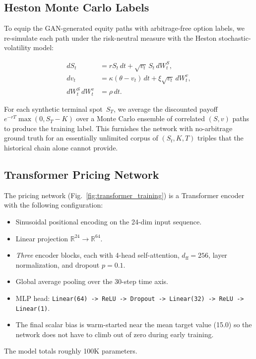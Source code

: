 \documentclass[conference]{IEEEtran}
\begin{document}
\subsection{Heston Monte Carlo Labels}

To equip the GAN-generated equity paths with arbitrage-free
option labels, we re-simulate each path under the risk-neutral
measure with the Heston stochastic-volatility model:

\begin{align}
dS_t &= r S_t\, dt + \sqrt{v_t}\, S_t\, dW_t^S, \\
dv_t &= \kappa(\theta - v_t)\, dt + \xi \sqrt{v_t}\, dW_t^v, \\
dW_t^S\, dW_t^v &= \rho\, dt.
\end{align}

For each synthetic terminal spot~$S_T$, we average the
discounted payoff $e^{-rT} \max(0, S_T - K)$ over a Monte
Carlo ensemble of correlated $(S, v)$ paths to produce the
training label. This furnishes the network with no-arbitrage
ground truth for an essentially unlimited corpus of
$(S_t, K, T)$ triples that the historical chain alone cannot
provide.

\subsection{Transformer Pricing Network}

The pricing network (Fig.~\ref{fig:transformer_training}) is a
Transformer encoder with the following configuration:

\begin{itemize}
\item Sinusoidal positional encoding on the 24-dim input
sequence.
\item Linear projection $\mathbb{R}^{24} \to \mathbb{R}^{64}$.
\item \emph{Three} encoder blocks, each with 4-head
self-attention, $d_{\text{ff}} = 256$, layer normalization,
and dropout $p=0.1$.
\item Global average pooling over the 30-step time axis.
\item MLP head: \texttt{Linear(64) -> ReLU -> Dropout ->
Linear(32) -> ReLU -> Linear(1)}.
\item The final scalar bias is warm-started near the mean
target value (15.0) so the network does not have to climb out
of zero during early training.
\end{itemize}

The model totals roughly 100K parameters.
\end{document}
